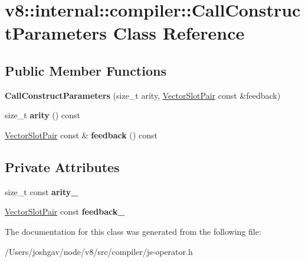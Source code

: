 \hypertarget{classv8_1_1internal_1_1compiler_1_1_call_construct_parameters}{}\section{v8\+:\+:internal\+:\+:compiler\+:\+:Call\+Construct\+Parameters Class Reference}
\label{classv8_1_1internal_1_1compiler_1_1_call_construct_parameters}
\subsection*{Public Member Functions}
\begin{DoxyCompactItemize}
\item 
{\bfseries Call\+Construct\+Parameters} (size\+\_\+t arity, \hyperlink{classv8_1_1internal_1_1compiler_1_1_vector_slot_pair}{Vector\+Slot\+Pair} const \&feedback)\hypertarget{classv8_1_1internal_1_1compiler_1_1_call_construct_parameters_ad988edb677bff5ebb035e7d6fa6f5dab}{}\label{classv8_1_1internal_1_1compiler_1_1_call_construct_parameters_ad988edb677bff5ebb035e7d6fa6f5dab}

\item 
size\+\_\+t {\bfseries arity} () const \hypertarget{classv8_1_1internal_1_1compiler_1_1_call_construct_parameters_a98f03b69183dc5d76f40ad79a294ed2b}{}\label{classv8_1_1internal_1_1compiler_1_1_call_construct_parameters_a98f03b69183dc5d76f40ad79a294ed2b}

\item 
\hyperlink{classv8_1_1internal_1_1compiler_1_1_vector_slot_pair}{Vector\+Slot\+Pair} const \& {\bfseries feedback} () const \hypertarget{classv8_1_1internal_1_1compiler_1_1_call_construct_parameters_ac0dc7b679fbf52dd5618c9b3b16ee9ad}{}\label{classv8_1_1internal_1_1compiler_1_1_call_construct_parameters_ac0dc7b679fbf52dd5618c9b3b16ee9ad}

\end{DoxyCompactItemize}
\subsection*{Private Attributes}
\begin{DoxyCompactItemize}
\item 
size\+\_\+t const {\bfseries arity\+\_\+}\hypertarget{classv8_1_1internal_1_1compiler_1_1_call_construct_parameters_ac40aebfd7631f6f30f70c89d10195e24}{}\label{classv8_1_1internal_1_1compiler_1_1_call_construct_parameters_ac40aebfd7631f6f30f70c89d10195e24}

\item 
\hyperlink{classv8_1_1internal_1_1compiler_1_1_vector_slot_pair}{Vector\+Slot\+Pair} const {\bfseries feedback\+\_\+}\hypertarget{classv8_1_1internal_1_1compiler_1_1_call_construct_parameters_a400a6364d4cd94b686c55713ddaf2b17}{}\label{classv8_1_1internal_1_1compiler_1_1_call_construct_parameters_a400a6364d4cd94b686c55713ddaf2b17}

\end{DoxyCompactItemize}


The documentation for this class was generated from the following file\+:\begin{DoxyCompactItemize}
\item 
/\+Users/joshgav/node/v8/src/compiler/js-\/operator.\+h\end{DoxyCompactItemize}
